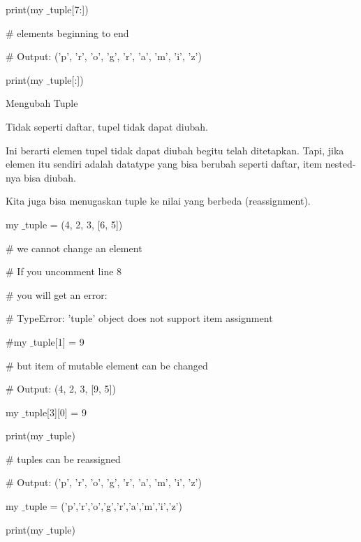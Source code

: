 print(my $  \_  $tuple[7:]) \par
\vspace{12pt}
 $  \#  $ elements beginning to end \par
 $  \#  $ Output: ('p', 'r', 'o', 'g', 'r', 'a', 'm', 'i', 'z') \par
print(my $  \_  $tuple[:]) \par
\vspace{12pt}
Mengubah Tuple \par
\vspace{12pt}
Tidak seperti daftar, tupel tidak dapat diubah. \par
\vspace{12pt}
Ini berarti elemen tupel tidak dapat diubah begitu telah ditetapkan. Tapi, jika elemen itu sendiri adalah datatype yang bisa berubah seperti daftar, item nested-nya bisa diubah. \par
\vspace{12pt}
Kita juga bisa menugaskan tuple ke nilai yang berbeda (reassignment). \par
\vspace{12pt}
my $  \_  $tuple = (4, 2, 3, [6, 5]) \par
\vspace{12pt}
 $  \#  $ we cannot change an element \par
 $  \#  $ If you uncomment line 8 \par
 $  \#  $ you will get an error: \par
 $  \#  $ TypeError: 'tuple' object does not support item assignment \par
\vspace{12pt}
 $  \#  $my $  \_  $tuple[1] = 9 \par
\vspace{12pt}
 $  \#  $ but item of mutable element can be changed \par
 $  \#  $ Output: (4, 2, 3, [9, 5]) \par
my $  \_  $tuple[3][0] = 9 \par
print(my $  \_  $tuple) \par
\vspace{12pt}
 $  \#  $ tuples can be reassigned \par
 $  \#  $ Output: ('p', 'r', 'o', 'g', 'r', 'a', 'm', 'i', 'z') \par
my $  \_  $tuple = ('p','r','o','g','r','a','m','i','z') \par
print(my $  \_  $tuple) \par
\vspace{12pt}
